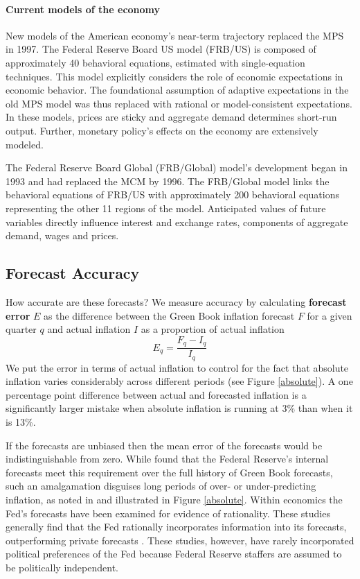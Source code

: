 \documentclass[a4paper]{article}\usepackage{graphicx, color}
\begin{document}
\paragraph{Current models of the economy}
New models of the American economy's near-term trajectory replaced the MPS in 1997. The Federal Reserve Board US model (FRB/US) is composed of approximately 40 behavioral equations, estimated with single-equation techniques. This model explicitly considers the role of economic expectations in economic behavior. The foundational assumption of adaptive expectations in the old MPS model was thus replaced with rational or model-consistent expectations. In these models, prices are sticky and aggregate demand determines short-run output. Further, monetary policy's effects on the economy are extensively modeled. 

The Federal Reserve Board Global (FRB/Global) model's development began in 1993 and had replaced the MCM by 1996. The FRB/Global model links the behavioral equations of FRB/US with approximately 200 behavioral equations representing the other 11 regions of the model. Anticipated values of future variables directly influence interest and exchange rates, components of aggregate demand, wages and prices.

\subsection{Forecast Accuracy}\label{ForecastAcc}

How accurate are these forecasts? We measure accuracy by calculating {\bf{forecast error}} $E$ as the difference between the Green Book inflation forecast $F$ for a given quarter $q$ and actual inflation $I$ as a proportion of actual inflation
%
\begin{equation}
    E_{q} = \frac{F_{q} - I_{q}}{I_{q}}
\end{equation}
%
We put the error in terms of actual inflation to control for the fact that absolute inflation varies considerably across different periods (see Figure \ref{absolute}). A one percentage point difference between actual and forecasted inflation is a significantly larger mistake when absolute inflation is running at 3\% than when it is 13\%. 

If the forecasts are unbiased then the mean error of the forecasts would be indistinguishable from zero. While \cite{Romer2000} found that the Federal Reserve's internal forecasts  meet this requirement over the full history of Green Book forecasts, such an amalgamation disguises long periods of over- or under-predicting inflation, as noted in \cite{Capistran2006} and illustrated in Figure \ref{absolute}. Within economics the Fed's forecasts have been examined for evidence of rationality. These studies generally find that the Fed rationally incorporates information into its forecasts, outperforming private forecasts \cite[c.f.][]{Gamber2009}. These studies, however, have rarely incorporated political preferences of the Fed because Federal Reserve staffers are assumed to be politically independent.
\end{document}
